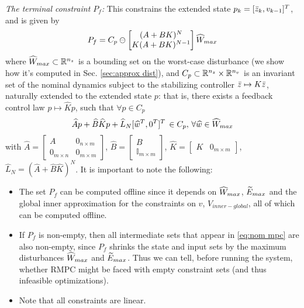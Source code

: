 \textit{The terminal constraint $P_f$:}
This constrains the extended state $p_k = [\bar{z}_{k}, v_{k-1}]^T$, and is given by 
\begin{equation}
\label{eq:P_f_def}
P_f = C_p\ominus \left\lbrack \begin{matrix} (A+BK)^N \\ K(A+BK)^{N-1}\end{matrix} \right \rbrack \widehat{W}_{max}
\end{equation}
where $\widehat{W}_{max} \subset \mathbb{R}^{n_z}$ is a bounding set on the worst-case disturbance (we show how it's computed in Sec. \ref{sec:approx dist}),
and $C_p \subset \mathbb{R}^{n_z}\times \mathbb{R}^{n_v}$ is an invariant set of the nominal dynamics subject to the stabilizing controller $\bar{z} \mapsto K\bar{z}$, naturally extended to the extended state $p$:
that is, there exists a feedback control law $p \mapsto \widehat{K}p$, such that $\forall p\in C_p$
\begin{eqnarray}
\label{eq:C_def}
\widehat{A} p + \widehat{B} \widehat{K} p + \widehat{L}_N  [\widehat{w}^T, 0^T]^T \, \in C_p,\, \forall \widehat{w} \in \widehat{W}_{max} 
\end{eqnarray}
with $\widehat{A} = \begin{bmatrix} A & 0_{n \times m} \\ 0_{m \times n} & 0_{m \times m}   \end{bmatrix} $,
$\widehat{B} = \begin{bmatrix}  B \\ \mathbb{I}_{m \times m} \end{bmatrix}$, 
$\widehat{K} = \begin{bmatrix}  K & 0_{m \times m}  \end{bmatrix}$,
$\widehat{L} _N = (\widehat{A} + \widehat{B} \widehat{K})^N$.
It is important to note the following:
\begin{itemize}
	\item The set $P_f$ can be computed offline since it depends on $\widehat{W}_{max}$, $\widetilde{E}_{max}$ and the global inner approximation for the constraints on $v$, $V_{inner-global}$, all of which can be computed offline.
	\item If $P_f$ is non-empty, then all intermediate sets that appear in \eqref{eq:nom mpc} are also non-empty, since $P_f$ shrinks the state and input sets by the maximum disturbances $\widehat{W}_{max}$ and $\widetilde{E}_{max}$.	
	Thus we can tell, before running the system, whether RMPC might be faced with empty constraint sets (and thus infeasible optimizations).
	\item Note that all constraints are linear.
\end{itemize}



